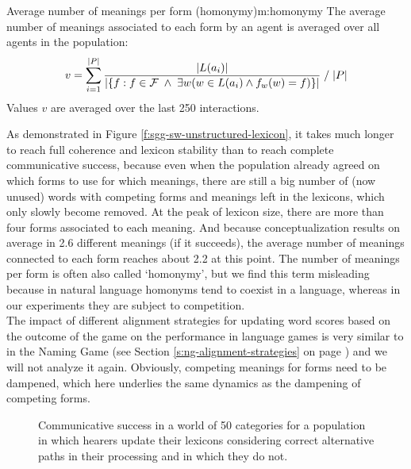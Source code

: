 \begin{measure}[b]{Average number of meanings per form
    (homonymy)}{m:homonymy}
  The average number of meanings associated to each form by an agent
  is averaged over all agents in the population:
  $$v= \sum_{i=1}^{|P|}{\frac{|L(a_i)|}{|\{f:f \in {\cal F}\;\wedge\;\exists w ( w \in L(a_i) \wedge f_w(w) = f)  \}|}}\;/\;|P|$$
  Values $v$ are averaged over the last 250 interactions.
\end{measure}


As demonstrated in Figure \ref{f:sgg-sw-unstructured-lexicon}, it
takes much longer to reach full coherence and lexicon stability than
to reach complete communicative success, because even when the
population already agreed on which forms to use for which meanings,
there are still a big number of (now unused) words with competing
forms and meanings left in the lexicons, which only slowly become
removed. At the peak of lexicon size, there are more than four forms
associated to each meaning. And because conceptualization results on
average in 2.6 different meanings (if it succeeds), the average number
of meanings connected to each form reaches about 2.2 at this
point. The number of meanings per form is often also called
`homonymy', but we find this term misleading because in natural
language homonyms tend to coexist in a language, whereas in our
experiments they are subject to competition.\\


\noindent The impact of different alignment strategies for updating
word scores based on the outcome of the game on the performance in
language games is very similar to in the Naming Game (see Section
\ref{s:ng-alignment-strategies} on page
\pageref{s:ng-alignment-strategies}) and we will not analyze it
again. Obviously, competing meanings for forms need to be dampened,
which here underlies the same dynamics as the dampening of competing
forms.

\startfiguregroup


\begin{figure}[t]
  \caption{Communi\-cative success in a world of 50 categories for a
    population in which hearers update their lexicons considering
    correct alternative paths in their processing and in which they do
    not.}
  \label{f:sgg-sw-unstructured-50-attrs-use-correct-alternative-interpretation-vs-communicative-success}
\end{figure}

